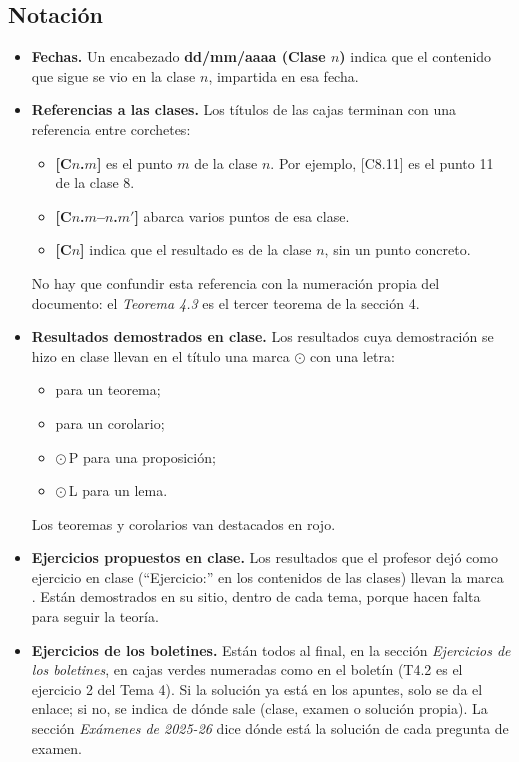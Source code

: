 \subsection*{Notación}
\begin{itemize}
    \item \textbf{Fechas.} Un encabezado \textbf{dd/mm/aaaa (Clase $n$)} indica que el contenido que sigue se vio en la clase $n$, impartida en esa fecha.
    \item \textbf{Referencias a las clases.} Los títulos de las cajas terminan con una referencia entre corchetes:
    \begin{itemize}
        \item \textbf{[C$n$.$m$]} es el punto $m$ de la clase $n$. Por ejemplo, [C8.11] es el punto 11 de la clase 8.
        \item \textbf{[C$n$.$m$–$n$.$m'$]} abarca varios puntos de esa clase.
        \item \textbf{[C$n$]} indica que el resultado es de la clase $n$, sin un punto concreto.
    \end{itemize}
    No hay que confundir esta referencia con la numeración propia del documento: el \emph{Teorema 4.3} es el tercer teorema de la sección 4.
    \item \textbf{Resultados demostrados en clase.} Los resultados cuya demostración se hizo en clase llevan en el título una marca $\odot$ con una letra:
    \begin{itemize}
        \item {} para un teorema;
        \item {} para un corolario;
        \item $\odot$\,P para una proposición;
        \item $\odot$\,L para un lema.
    \end{itemize}
    Los teoremas y corolarios van destacados en rojo.
    \item \textbf{Ejercicios propuestos en clase.} Los resultados que el profesor dejó como ejercicio en clase (``Ejercicio:'' en los contenidos de las clases) llevan la marca \marcaE. Están demostrados en su sitio, dentro de cada tema, porque hacen falta para seguir la teoría.
    \item \textbf{Ejercicios de los boletines.} Están todos al final, en la sección \emph{Ejercicios de los boletines}, en cajas verdes numeradas como en el boletín (T4.2 es el ejercicio 2 del Tema 4). Si la solución ya está en los apuntes, solo se da el enlace; si no, se indica de dónde sale (clase, examen o solución propia). La sección \emph{Exámenes de 2025-26} dice dónde está la solución de cada pregunta de examen.
\end{itemize}
